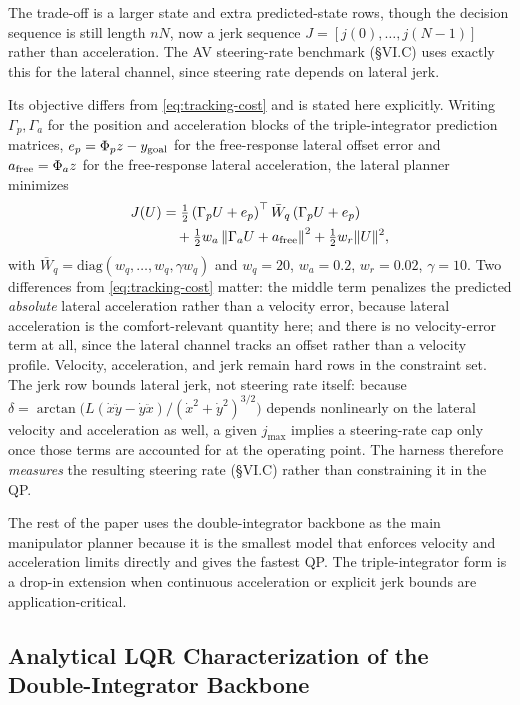 The trade-off is a larger state and extra predicted-state rows, though the
decision sequence is still length \(nN\), now a jerk sequence
\(J=[j(0),\dots,j(N-1)]\) rather than acceleration. The AV steering-rate
benchmark (§VI.C) uses exactly this for the lateral channel, since steering
rate depends on lateral jerk.

Its objective differs from \eqref{eq:tracking-cost} and is stated here
explicitly. Writing \(\Gamma_p,\Gamma_a\) for the position and acceleration
blocks of the triple-integrator prediction matrices, \(e_p=\Phi_p z-y_{\rm
goal}\) for the free-response lateral offset error and \(a_{\rm free}=\Phi_a z\)
for the free-response lateral acceleration, the lateral planner minimizes
\begin{align}
\label{eq:lateral-cost}
J(U)&=\tfrac12\left(\Gamma_pU+e_p\right)^\top \bar W_q\left(\Gamma_pU+e_p\right)
\nonumber\\
&\quad+\tfrac12 w_a\left\|\Gamma_aU+a_{\rm free}\right\|^2
+\tfrac12 w_r\|U\|^2 ,
\end{align}
with \(\bar W_q=\mathrm{diag}(w_q,\dots,w_q,\gamma w_q)\) and
\(w_q=20\), \(w_a=0.2\), \(w_r=0.02\), \(\gamma=10\). Two differences from
\eqref{eq:tracking-cost} matter: the middle term penalizes the predicted
\emph{absolute} lateral acceleration rather than a velocity error, because
lateral acceleration is the comfort-relevant quantity here; and there is no
velocity-error term at all, since the lateral channel tracks an offset rather
than a velocity profile. Velocity, acceleration, and jerk remain hard rows in
the constraint set. The jerk row bounds lateral jerk, not steering
rate itself: because
\(\delta=\arctan\!\big(L(\dot x\ddot y-\dot y\ddot x)/(\dot x^2+\dot y^2)^{3/2}\big)\)
depends nonlinearly on the lateral velocity and acceleration as well, a given
\(j_{\max}\) implies a steering-rate cap only once those terms are accounted
for at the operating point. The harness therefore \emph{measures} the
resulting steering rate (§VI.C) rather than constraining it in the QP.

The rest of the paper uses the double-integrator backbone as the main
manipulator planner because it is the smallest model that enforces
velocity and acceleration limits directly and gives the fastest QP. The
triple-integrator form is a drop-in extension when continuous
acceleration or explicit jerk bounds are application-critical.

\subsection{Analytical LQR Characterization of the Double-Integrator
Backbone}\label{e.-analytical-lqr-characterization-of-the-double-integrator-backbone}

